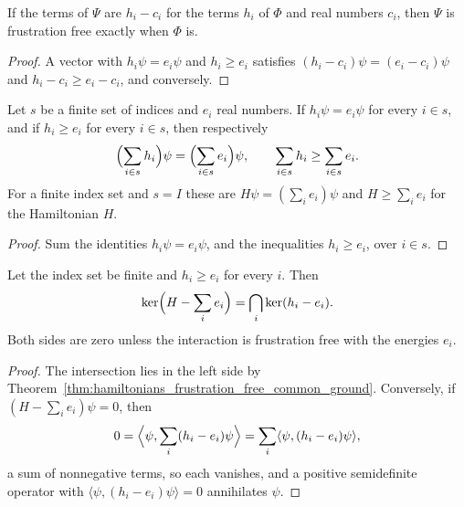 \begin{theorem}
    \label{thm:hamiltonians_frustration_free_shift}
    \leanok
    If the terms of $\Psi$ are $h_i-c_i$ for the terms $h_i$ of $\Phi$ and real
    numbers $c_i$, then $\Psi$ is frustration free exactly when $\Phi$ is.
\end{theorem}
\begin{proof}\leanok
    A vector with $h_i\psi=e_i\psi$ and $h_i\ge e_i$ satisfies
    $(h_i-c_i)\psi=(e_i-c_i)\psi$ and $h_i-c_i\ge e_i-c_i$, and conversely.
\end{proof}

\begin{theorem}
    \label{thm:hamiltonians_frustration_free_common_ground}
    \leanok
    Let $s$ be a finite set of indices and $e_i$ real numbers. If $h_i\psi=e_i\psi$
    for every $i\in s$, and if $h_i\ge e_i$ for every $i\in s$, then respectively
    \[
        \Bigl(\sum_{i\in s}h_i\Bigr)\psi=\Bigl(\sum_{i\in s}e_i\Bigr)\psi,\qquad
        \sum_{i\in s}h_i\ge\sum_{i\in s}e_i .
    \]
    For a finite index set and $s=I$ these are $H\psi=(\sum_ie_i)\psi$ and
    $H\ge\sum_ie_i$ for the Hamiltonian $H$.
\end{theorem}
\begin{proof}\leanok
    Sum the identities $h_i\psi=e_i\psi$, and the inequalities $h_i\ge e_i$, over
    $i\in s$.
\end{proof}

\begin{theorem}
    \label{thm:hamiltonians_frustration_free_ground_space}
    \leanok
    Let the index set be finite and $h_i\ge e_i$ for every $i$. Then
    \[
        \ker\Bigl(H-\sum_ie_i\Bigr)=\bigcap_i\ker(h_i-e_i).
    \]
    Both sides are zero unless the interaction is frustration free with the
    energies $e_i$.
\end{theorem}
\begin{proof}\leanok
    The intersection lies in the left side by
    Theorem~\ref{thm:hamiltonians_frustration_free_common_ground}. Conversely, if
    $(H-\sum_ie_i)\psi=0$, then
    \[
        0=\Bigl\langle\psi,\sum_i(h_i-e_i)\psi\Bigr\rangle
        =\sum_i\langle\psi,(h_i-e_i)\psi\rangle,
    \]
    a sum of nonnegative terms, so each vanishes, and a positive semidefinite
    operator with $\langle\psi,(h_i-e_i)\psi\rangle=0$ annihilates $\psi$.
\end{proof}

